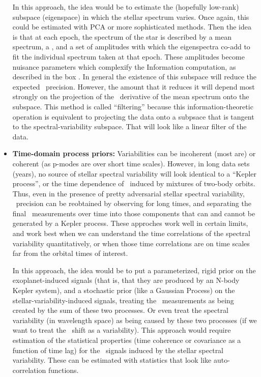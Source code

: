 \documentclass[12pt, letterpaper]{article}
\begin{document}
\begin{itemize}
In this approach, the idea would be to estimate the (hopefully
low-rank) subspace (eigenspace) in which the stellar spectrum varies.
Once again, this could be estimated with PCA or more sophisticated
methods.
Then the idea is that at each epoch, the spectrum of the star is
described by a mean spectrum, a \RV, and a set of amplitudes with
which the eigenspectra co-add to fit the individual spectrum taken at
that epoch.
These amplitudes become nuisance parameters which complexify the
Information computation, as described in the box .
In general the existence of this subspace will reduce the expected
\RV\ precision.
However, the amount that it reduces it will depend most strongly on
the projection of the \RV\ derivative of the mean spectrum onto the
subspace.
This method is called ``filtering'' because this information-theoretic
operation is equivalent to projecting the data onto a subpsace that is
tangent to the spectral-variability subspace.
That will look like a linear filter of the data.
\item
\textbf{Time-domain process priors:}
Variabilities can be incoherent (most are) or coherent (as p-modes are
over short time scales).
However, in long data sets (years), no source of stellar spectral
variability will look identical to a ``Kepler process'', or the time
dependence of \RV\ induced by mixtures of two-body orbits.
Thus, even in the presence of pretty adversarial stellar spectral
variability, \EPRV\ precision can be reobtained by observing for long
times, and separating the final \RV\ measurements over time into those
components that can and cannot be generated by a Kepler process.
These approches work well in certain limits, and work best when we can
understand the time correlations of the spectral variability quantitatively,
or when those time correlations are on time scales far from the
orbital times of interest.

In this approach, the idea would be to put a parameterized, rigid
prior on the exoplanet-induced signals (that is, that they are produced
by an N-body Kepler system), and a stochastic prior (like a Gaussian
Process) on the stellar-variability-induced signals, treating the
\RV\ measurements as being created by the sum of these two
processes.
Or even treat the spectral variability (in wavelength space) as being caused by these two
processes (if we want to treat the \RV\ shift as a variability).
This approach would require estimation of the statistical properties
(time coherence or covariance as a function of time lag) for the
\RV\ signals induced by the stellar spectral variability.
These can be estimated with statistics that look like auto-correlation
functions.


\end{itemize}
\end{document}

